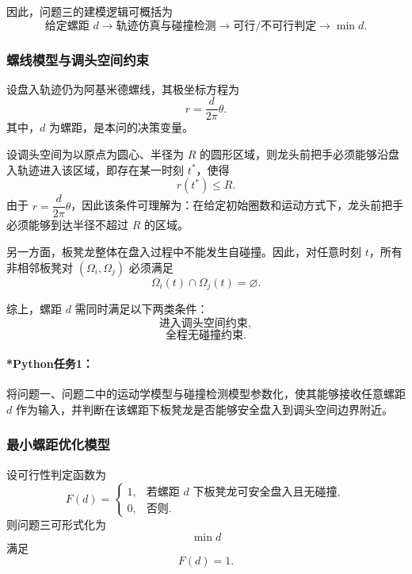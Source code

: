\documentclass[12pt,a4paper]{ctexart}
\begin{document}
因此，问题三的建模逻辑可概括为
\[
\text{给定螺距 } d \longrightarrow \text{轨迹仿真与碰撞检测} \longrightarrow \text{可行/不可行判定} \longrightarrow \min d.
\]

\subsubsection{螺线模型与调头空间约束}
设盘入轨迹仍为阿基米德螺线，其极坐标方程为
\begin{equation}
r=\frac{d}{2\pi}\theta.
\end{equation}
其中，$d$ 为螺距，是本问的决策变量。

设调头空间为以原点为圆心、半径为 $R$ 的圆形区域，则龙头前把手必须能够沿盘入轨迹进入该区域，即存在某一时刻 $t^\ast$，使得
\begin{equation}
r(t^\ast)\le R.
\end{equation}
由于 $r=\dfrac{d}{2\pi}\theta$，因此该条件可理解为：在给定初始圈数和运动方式下，龙头前把手必须能够到达半径不超过 $R$ 的区域。

另一方面，板凳龙整体在盘入过程中不能发生自碰撞。因此，对任意时刻 $t$，所有非相邻板凳对 $(\Omega_i,\Omega_j)$ 必须满足
\begin{equation}
\Omega_i(t)\cap\Omega_j(t)=\varnothing.
\end{equation}

综上，螺距 $d$ 需同时满足以下两类条件：
\begin{equation}
\text{进入调头空间约束},
\end{equation}
\begin{equation}
\text{全程无碰撞约束}.
\end{equation}

\paragraph{*Python任务1：}
将问题一、问题二中的运动学模型与碰撞检测模型参数化，使其能够接收任意螺距 $d$ 作为输入，并判断在该螺距下板凳龙是否能够安全盘入到调头空间边界附近。

\subsubsection{最小螺距优化模型}
设可行性判定函数为
\begin{equation}
F(d)=
\begin{cases}
1, & \text{若螺距 } d \text{ 下板凳龙可安全盘入且无碰撞},\\
0, & \text{否则}.
\end{cases}
\end{equation}
则问题三可形式化为
\begin{equation}
\min d
\end{equation}
满足
\begin{equation}
F(d)=1.
\end{equation}
\end{document}
